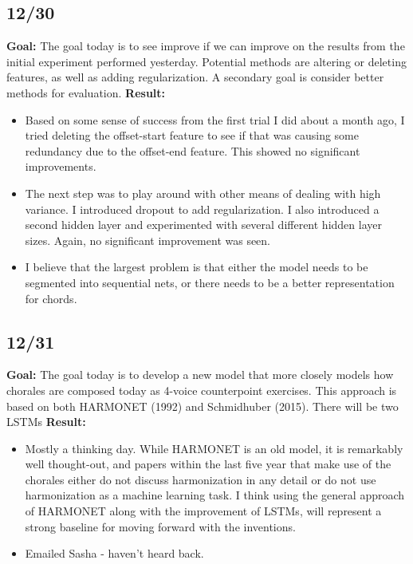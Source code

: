 \documentclass[12pt]{article}
\begin{document}
\subsection{12/30}
\textbf{Goal:} The goal today is to see improve if we can improve on the results from the initial experiment performed yesterday. Potential methods are altering or deleting features, as well as adding regularization. A secondary goal is consider better methods for evaluation.
\textbf{Result: }
\begin{itemize}
\item Based on some sense of success from the first trial I did about a month ago, I tried deleting the offset-start feature to see if that was causing some redundancy due to the offset-end feature. This showed no significant improvements.
\item The next step was to play around with other means of dealing with high variance. I introduced dropout to add regularization. I also introduced a second hidden layer and experimented with several different hidden layer sizes. Again, no significant improvement was seen.
\item I believe that the largest problem is that either the model needs to be segmented into sequential nets, or there needs to be a better representation for chords.
\end{itemize}

\subsection{12/31}
\textbf{Goal:} The goal today is to develop a new model that more closely models how chorales are composed today as 4-voice counterpoint exercises. This approach is based on both HARMONET (1992) and Schmidhuber (2015). There will be two LSTMs
\textbf{Result:} 
\begin{itemize}
\item Mostly a thinking day. While HARMONET is an old model, it is remarkably well thought-out, and papers within the last five year that make use of the chorales either do not discuss harmonization in any detail or do not use harmonization as a machine learning task. I think using the general approach of HARMONET along with the improvement of LSTMs, will represent a strong baseline for moving forward with the inventions.
\item Emailed Sasha - haven't heard back.
\end{itemize}
\end{document}
